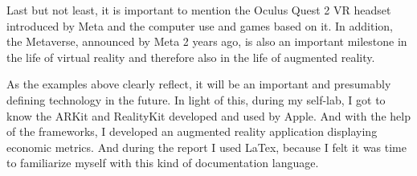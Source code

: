 Last but not least, it is important to mention the Oculus Quest 2 VR headset introduced by Meta and the computer use and games based on it. In addition, the Metaverse, announced by Meta 2 years ago, is also an important milestone in the life of virtual reality and therefore also in the life of augmented reality.

As the examples above clearly reflect, it will be an important and presumably defining technology in the future. In light of this, during my self-lab, I got to know the ARKit and RealityKit developed and used by Apple. And with the help of the frameworks, I developed an augmented reality application displaying economic metrics. And during the report I used LaTex, because I felt it was time to familiarize myself with this kind of documentation language.
